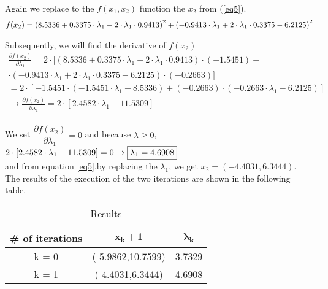 Again we replace to the $f(x_1,x_2)$ function the $x_2$ from (\ref{eq5}).
\begin{equation}
	\centering
	\begin{gathered}
		f(x_2) = \left(8.5336+0.3375 \cdot \lambda_1-2 \cdot \lambda_1 \cdot 0.9413 \right)^2+\left(-0.9413 \cdot \lambda_1+2 \cdot \lambda_1 \cdot 0.3375-6.2125\right)^2
	\end{gathered}
\end{equation}
\label{eq6}

Subsequently, we will find the derivative of $f(x_2)$\\
\[
\begin{gathered}
	\frac{\partial f(x_2)}{\partial \lambda_1} = 2\cdot[(8.5336+0.3375 \cdot \lambda_1-2 \cdot \lambda_1 \cdot 0.9413) \cdot (-1.5451)
	+ \\ \cdot(-0.9413 \cdot \lambda_1+2 \cdot \lambda_1 \cdot 0.3375-6.2125) \cdot (-0.2663)]\\
	= 2 \cdot [-1.5451 \cdot (-1.5451 \cdot \lambda_1+8.5336)+(-0.2663)\cdot(-0.2663\cdot\lambda_1-6.2125)] \\[2mm]
	\rightarrow \frac{\partial f(x_2)}{\partial \lambda_1} = 2\cdot[2.4582 \cdot \lambda_1-11.5309]
\end{gathered}
\]\\

We set $\dfrac{\partial f(x_2)}{\partial \lambda_1} = 0$ and because $\lambda \geq 0$,\\

$2\cdot[2.4582 \cdot \lambda_1-11.5309] = 0 \rightarrow \fbox{{\(\lambda_1 = 4.6908\)}}$ \\

and from equation \ref{eq5},by replacing the $\lambda_1$, we get $x_2 = (-4.4031,6.3444)$.
\\[4mm]
The results of the execution of the two iterations are shown in the following table.

\begin{table}[H]
	\centering
	\begin{tabular}{|c|c|c|}
		\hline
		\textbf{\# of iterations} & $\mathbf{x_k+1}$ & $\mathbf{\lambda_k}$ \\ \hline
		k = 0 & (-5.9862,10.7599) & 3.7329 \\ \hline
		k = 1 & (-4.4031,6.3444) & 4.6908\\
		\hline
	\end{tabular}
	\caption{Results}
\end{table}











